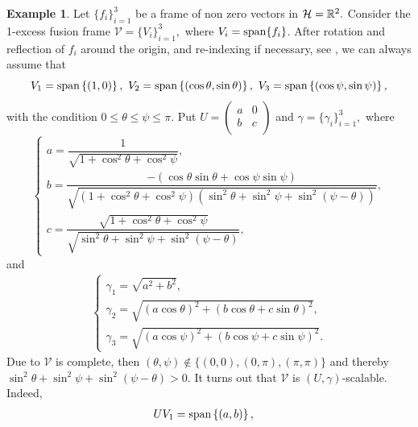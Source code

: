 \documentclass[sn-mathphys-num]{sn-jnl}%
\theoremstyle{definition}
\newtheorem{example}[theorem]{Example}
\theoremstyle{remark}
\numberwithin{equation}{section}
\begin{document}
\begin{example}
Let $\{f_{i}\}_{i=1}^3$ be a frame of non zero vectors in $\mathcal{H}=\Bbb{R}^2.$ Consider the 1-excess fusion frame $\mathcal{V}=\{V_{i}\}_{i =1}^{3},$ where $V_{i}=\textnormal{span}\{f_{i}\}$. After rotation and reflection of $f_{i}$ around the origin, and re-indexing if necessary, see \cite[Example 3.12]{Remarks}, we can always assume that 
\begin{equation*}
V_{1}=\textnormal{span}\left\lbrace (1,0) \right\rbrace ,~V_{2}=\textnormal{span}\left\lbrace \left( \cos\theta ,\sin \theta \right) \right\rbrace ,~V_{3}=\textnormal{span}\left\lbrace \left( \cos\psi ,\sin \psi \right) \right\rbrace ,
\end{equation*}
with the condition $0\leq \theta \leq \psi \leq\pi.$ Put $U=\begin{pmatrix}
   a  &  0 \\
   b  &  c  \\
\end{pmatrix} $ and $ \gamma=\{\gamma_{i}\}_{i=1}^3,$ where
\begin{equation}\label{tyyrg}
\begin{cases}
a= \dfrac{1}{\sqrt{1+\cos^2 \theta +\cos^2 \psi}},\\
b=\dfrac{-\left( \cos \theta \sin \theta +\cos \psi \sin \psi \right) }{\sqrt{\left( 1+\cos ^2 \theta +\cos ^2 \psi \right) \left( \sin^{2}\theta +\sin^{2}\psi +\sin^2 (\psi -\theta)\right) }}, \\
c= \dfrac{\sqrt{1+\cos^2 \theta +\cos^2 \psi}}{\sqrt{\sin^{2}\theta +\sin^{2}\psi +\sin^2 (\psi -\theta)}},
\end{cases}
\end{equation}
and
\begin{align*}
\begin{cases}
\gamma_{1}=\sqrt{a^{2}+b^{2}},
\\ \gamma_{2}=\sqrt{\left( a\cos\theta \right) ^{2}+\left( b\cos\theta +c\sin\theta \right) ^{2}},
\\ \gamma_{3}=\sqrt{\left( a\cos\psi \right) ^{2}+\left( b\cos\psi +c\sin\psi \right) ^{2}}.
\end{cases}
\end{align*}
Due to $\mathcal{V}$ is complete, then $(\theta,\psi) \not\in \{(0,0), (0,\pi), (\pi,\pi)\}$ and thereby $\sin^{2}\theta+\sin^{2}\psi+\sin^2 (\psi-\theta) > 0.$ It turns out that $\mathcal{V}$ is $(U,\gamma)$-scalable. Indeed,
\begin{align*}
UV_{1}&=\textnormal{span}\left\lbrace (a,b) \right\rbrace ,

\end{align*}
\end{example}
\end{document}
